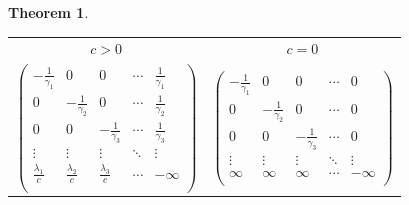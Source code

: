 \documentclass[a1,portrait]{a0poster}
\newtheorem{teorema}{Theorem}
\begin{document}
\begin{textblock}{15}
\begin{teorema}
    \begin{center}
      \begin{tabular}{cc}
        $c > 0$ & $c = 0$\\
        $
        \left(
          \begin{array}{ccccc}
            -\frac{1}{\gamma_1} & 0 & 0 & \cdots & \frac{1}{\gamma_1}\\
            0 & -\frac{1}{\gamma_2} & 0 & \cdots & \frac{1}{\gamma_2}\\
            0 & 0 & -\frac{1}{\gamma_3} & \cdots & \frac{1}{\gamma_3}\\
            \vdots & \vdots & \vdots & \ddots & \vdots \\
            \frac{\lambda_1}{c} & \frac{\lambda_2}{c} &
            \frac{\lambda_3}{c} & \cdots & -\infty\\
          \end{array}
        \right)
        $&$
        \left(
          \begin{array}{ccccc}
            -\frac{1}{\gamma_1} & 0 & 0 & \cdots & 0\\
            0 & -\frac{1}{\gamma_2} & 0 & \cdots & 0\\
            0 & 0 & -\frac{1}{\gamma_3} & \cdots & 0\\
            \vdots & \vdots & \vdots & \ddots & \vdots \\
            \infty & \infty & \infty & \cdots & -\infty\\
          \end{array}
        \right)
        $
      \end{tabular}
    \end{center}
  \end{teorema}
\end{textblock}
\end{document}
